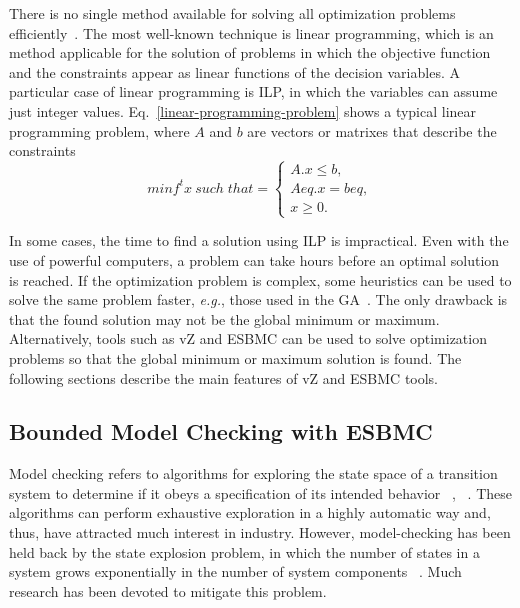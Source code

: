 There is no single method available for solving all optimization problems efficiently~\cite{Rao2009}. The most well-known technique is linear programming, which is an method applicable for the solution of problems in which the objective function and the constraints appear as linear functions of the decision variables. A particular case of linear programming is ILP, in which the variables can assume just integer values. Eq.~\ref{linear-programming-problem} shows a typical linear programming problem, where $A$ and $b$ are vectors or matrixes that describe the constraints
\begin{equation}
\label{linear-programming-problem}
  minf^t x \: such \; that  = 
  \begin{cases}
    A.x \leq b, \\ 
    Aeq.x = beq, \\ 
    x \geq 0.
  \end{cases}
\end{equation}

In some cases, the time to find a solution using ILP is impractical. Even with the use of powerful computers, a problem can take hours before an optimal solution is reached. If the optimization problem is complex, some heuristics can be used to solve the same problem faster, {\it e.g.}, those used in the GA~\cite{Rao2009}. The only drawback is that the found solution may not be the global minimum or maximum. Alternatively, tools such as vZ and ESBMC can be used to solve optimization problems so that the global minimum or maximum solution is found. The following sections describe the main features of vZ and ESBMC tools.

\subsection{Bounded Model Checking with ESBMC}
\label{Bounded-Model-Checking-with-ESBMC}

Model checking refers to algorithms for exploring the state space of a transition system to determine if it obeys a speciﬁcation of its intended behavior ~\cite{Baier2008}, ~\cite{Clarke2009}. These algorithms can perform exhaustive exploration in a highly automatic way and, thus, have attracted much interest in industry. However, model-checking has been held back by the state explosion problem, in which the number of states in a system grows exponentially in the number of system components ~\cite{Biere2009}. Much research has been devoted to mitigate this problem.

